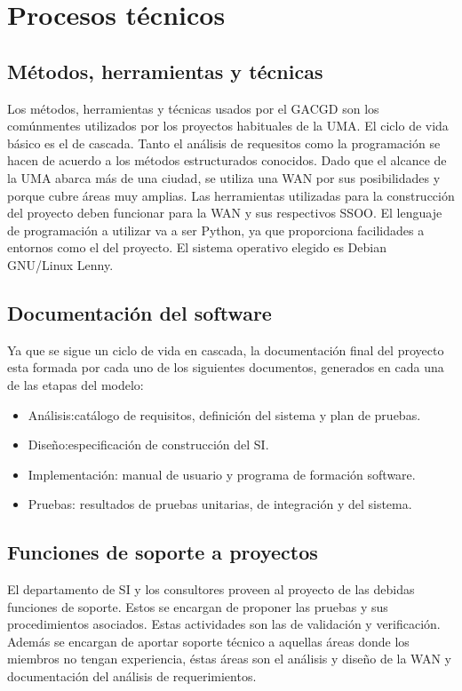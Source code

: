 \documentclass[11pt,a4paper,spanish,twoside]{report}
\begin{document}
\chapter{Procesos técnicos}
\section{Métodos, herramientas y técnicas}
Los métodos, herramientas y técnicas usados por el GACGD son los comúnmentes 
utilizados por los proyectos habituales de la UMA. El ciclo de vida básico es 
el de cascada. Tanto el análisis de requesitos como la programación se hacen 
de acuerdo a los métodos estructurados conocidos. Dado que el alcance de la 
UMA abarca más de una ciudad, se utiliza una WAN por sus posibilidades y 
porque cubre áreas muy amplias. Las herramientas utilizadas para la 
construcción del proyecto deben funcionar para la WAN y sus respectivos SSOO. 
El lenguaje de programación a utilizar va a ser Python, ya que proporciona 
facilidades a entornos como el del proyecto. El sistema operativo elegido es 
Debian GNU/Linux Lenny.

\section{Documentación del software}
Ya que se sigue un ciclo de vida en cascada, la documentación final del 
proyecto esta formada por cada uno de los siguientes documentos, generados en 
cada una de las etapas del modelo:

\begin{itemize}
\item Análisis:catálogo de requisitos, definición del sistema y plan de 
pruebas. 
\item Diseño:especificación de construcción del SI.
\item Implementación: manual de usuario y programa de formación software. 
\item Pruebas: resultados de pruebas unitarias, de integración y del sistema.
\end{itemize}

\section{Funciones de soporte a proyectos}
El departamento de SI y los consultores proveen al proyecto de las debidas 
funciones de soporte. Estos se encargan de proponer las pruebas y sus 
procedimientos asociados. Estas actividades son las de validación y 
verificación. Además se encargan de aportar soporte técnico a aquellas áreas 
donde los miembros no tengan experiencia, éstas áreas son el análisis y diseño 
de la WAN y documentación del análisis de requerimientos.
\end{document}

